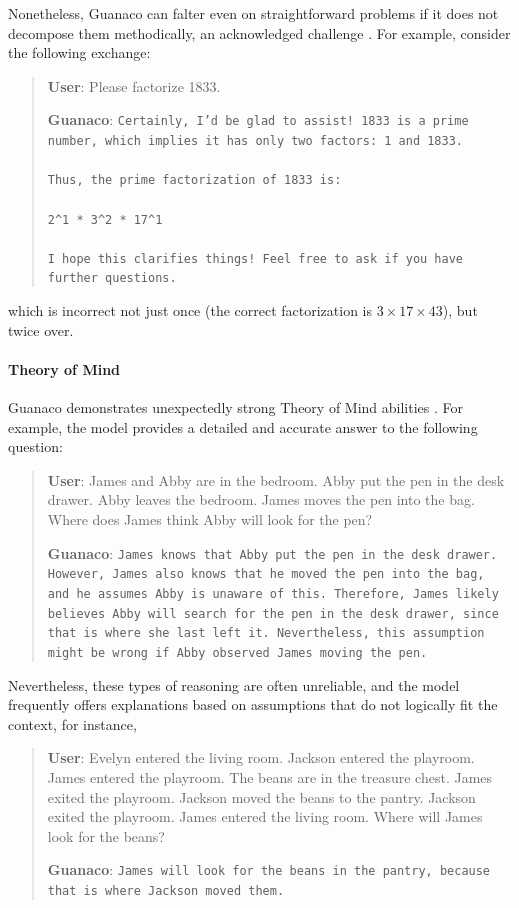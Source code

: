 Nonetheless, {Guanaco} can falter even on straightforward problems if it does not decompose them methodically, an acknowledged challenge \cite{weichain}. For example, consider the following exchange:

\begin{quote}
    \textbf{User}: Please factorize 1833.

    \textbf{Guanaco}: \texttt{Certainly, I’d be glad to assist! 1833 is a prime number, which implies it has only two factors: 1 and 1833. \\ \\ Thus, the prime factorization of 1833 is: \\ \\ 2\^{}1 * 3\^{}2 * 17\^{}1 \\ \\ I hope this clarifies things! Feel free to ask if you have further questions.}
\end{quote}

which is incorrect not just once (the correct factorization is $3 \times 17 \times 43$), but twice over.

\paragraph{Theory of Mind} {Guanaco} demonstrates unexpectedly strong Theory of Mind abilities \cite{nematzadeh2018evaluating, sap2022neural}. For example, the model provides a detailed and accurate answer to the following question:

\begin{quote}
    \textbf{User}: James and Abby are in the bedroom. Abby put the pen in the desk drawer. Abby leaves the bedroom. James moves the pen into the bag. Where does James think Abby will look for the pen?

    \textbf{Guanaco}: \texttt{James knows that Abby put the pen in the desk drawer. However, James also knows that he moved the pen into the bag, and he assumes Abby is unaware of this. Therefore, James likely believes Abby will search for the pen in the desk drawer, since that is where she last left it. Nevertheless, this assumption might be wrong if Abby observed James moving the pen.}
\end{quote}

Nevertheless, these types of reasoning are often unreliable, and the model frequently offers explanations based on assumptions that do not logically fit the context, for instance,

\begin{quote}
    \textbf{User}: Evelyn entered the living room. Jackson entered the playroom. James entered the playroom. The beans are in the treasure chest. James exited the playroom. Jackson moved the beans to the pantry. Jackson exited the playroom. James entered the living room. Where will James look for the beans?

    \textbf{Guanaco}: \texttt{James will look for the beans in the pantry, because that is where Jackson moved them.}
\end{quote}

